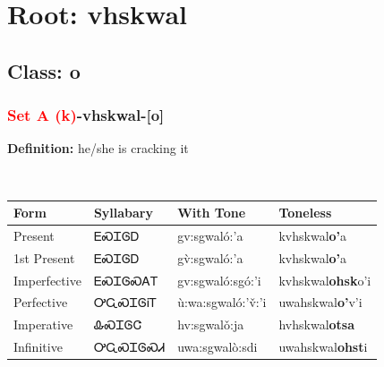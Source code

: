 \needspace{4in}
\section*{Root: vhskwal}
\nopagebreak
{}
\needspace{3in}
\subsection*{Class: o}
\nopagebreak
\needspace{2in}
\subsubsection*{\textcolor{Red}{Set A (k)}{-}\textbf{vhskwal}{-}[o]}
\nopagebreak
\textbf{Definition: } he/she is cracking it
\\[0.5em]
\begin{tabularx}{\textwidth}{l X X X}%
\toprule%
\textbf{Form}&\textbf{Syllabary}&\textbf{With Tone}&\textbf{Toneless}\\%
\midrule%
Present&ᎬᏍᏆᎶᎠ&gv:sgwaló:’a&kvhskwal\textbf{o'}a\\%
1st Present&ᎬᏍᏆᎶᎠ&gv̀:sgwaló:’a&kvhskwal\textbf{o'}a\\%
Imperfective&ᎬᏍᏆᎶᏍᎪᎢ&gv:sgwaló:sgó:’i&kvhskwal\textbf{ohsk}o'i\\%
Perfective&ᎤᏩᏍᏆᎶᎥᎢ&ù:wa:sgwaló:’v̌:’i&uwahskwal\textbf{o'}v'i\\%
Imperative&ᎲᏍᏆᎶᏣ&hv:sgwalǒ:ja&hvhskwal\textbf{otsa}\\%
Infinitive&ᎤᏩᏍᏆᎶᏍᏗ&uwa:sgwalò:sdi&uwahskwal\textbf{ohst}i\\%
\bottomrule%
\end{tabularx}
\\[1em]